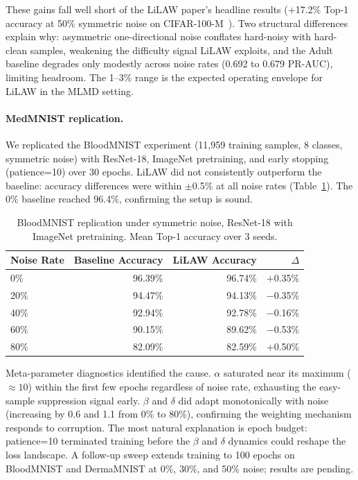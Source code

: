 These gains fall well short of the LiLAW paper's headline results ($+$17.2\% Top-1 accuracy at 50\% symmetric noise on CIFAR-100-M~\cite{moturu_lilaw_2025}). Two structural differences explain why: asymmetric one-directional noise conflates hard-noisy with hard-clean samples, weakening the difficulty signal LiLAW exploits, and the Adult baseline degrades only modestly across noise rates (0.692 to 0.679 PR-AUC), limiting headroom. The 1--3\% range is the expected operating envelope for LiLAW in the MLMD setting.

\paragraph{MedMNIST replication.}

We replicated the BloodMNIST experiment (11,959 training samples, 8 classes, symmetric noise) with ResNet-18, ImageNet pretraining, and early stopping (patience=10) over 30 epochs. LiLAW did not consistently outperform the baseline: accuracy differences were within $\pm$0.5\% at all noise rates (Table~\ref{tab:medmnist_v1}). The 0\% baseline reached 96.4\%, confirming the setup is sound.

\begin{table}[htbp]
    \centering
    \caption{BloodMNIST replication under symmetric noise, ResNet-18 with ImageNet pretraining. Mean Top-1 accuracy over 3 seeds.}
    \label{tab:medmnist_v1}
    \small
    \begin{tabular}{lrrr}
        \toprule
        \textbf{Noise Rate} & \textbf{Baseline Accuracy} & \textbf{LiLAW Accuracy} & \textbf{$\Delta$} \\
        \midrule
        0\%  & 96.39\% & 96.74\% & $+$0.35\% \\
        20\% & 94.47\% & 94.13\% & $-$0.35\% \\
        40\% & 92.94\% & 92.78\% & $-$0.16\% \\
        60\% & 90.15\% & 89.62\% & $-$0.53\% \\
        80\% & 82.09\% & 82.59\% & $+$0.50\% \\
        \bottomrule
    \end{tabular}
\end{table}

Meta-parameter diagnostics identified the cause. $\alpha$ saturated near its maximum (${\approx}10$) within the first few epochs regardless of noise rate, exhausting the easy-sample suppression signal early. $\beta$ and $\delta$ did adapt monotonically with noise (increasing by 0.6 and 1.1 from 0\% to 80\%), confirming the weighting mechanism responds to corruption. The most natural explanation is epoch budget: patience=10 terminated training before the $\beta$ and $\delta$ dynamics could reshape the loss landscape. A follow-up sweep extends training to 100 epochs on BloodMNIST and DermaMNIST at 0\%, 30\%, and 50\% noise; results are pending.

